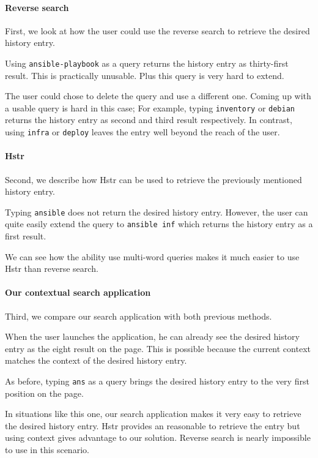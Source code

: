 \paragraph{Reverse search} 
First, we look at how the user could use the reverse search to retrieve the desired history entry.

Using \verb|ansible-playbook| as a query returns the history entry as thirty-first result. This is practically unusable. Plus this query is very hard to extend.

The user could chose to delete the query and use a different one. Coming up with a usable query is hard in this case; For example, typing \verb|inventory| or \verb|debian| returns the history entry as second and third result respectively. In contrast, using \verb|infra| or \verb|deploy| leaves the entry well beyond the reach of the user. 

\paragraph{Hstr}
Second, we describe how Hstr can be used to retrieve the previously mentioned history entry.

Typing \verb|ansible| does not return the desired history entry. However, the user can quite easily extend the query to \verb|ansible inf| which returns the history entry as a first result. 

We can see how the ability use multi-word queries makes it much easier to use Hstr than reverse search.

\paragraph{Our contextual search application}

Third, we compare our search application with both previous methods. 

When the user launches the application, he can already see the desired history entry as the eight result on the page. This is possible because the current context matches the context of the desired history entry. 

As before, typing \verb|ans| as a query brings the desired history entry to the very first position on the page. 

In situations like this one, our search application makes it very easy to retrieve the desired history entry. Hstr provides an reasonable to retrieve the entry but using context gives advantage to our solution. Reverse search is nearly impossible to use in this scenario.



